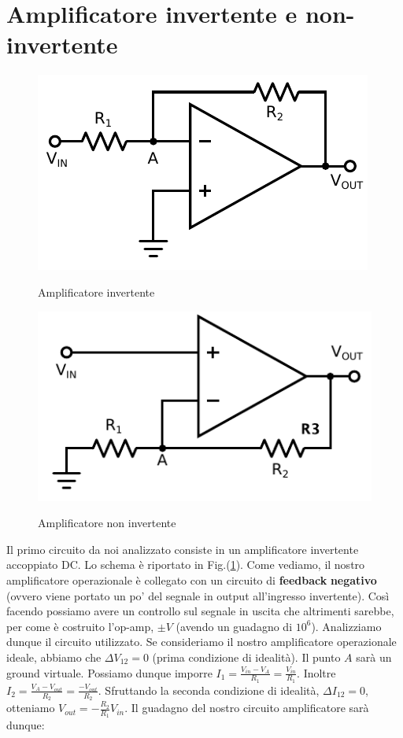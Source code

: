 \section{Amplificatore invertente e non-invertente}

\begin{figure}[h!]
\centering
		\begin{minipage}[c]{.4\textwidth}
			\centering

			\includegraphics[width=.65\textwidth]{ccinv.pdf}
			\label{fig:ccinv}
			\caption{Amplificatore invertente}

		\end{minipage}%
		\hspace{10mm}%
		\begin{minipage}[c]{.4\textwidth}
			\centering

			\includegraphics[width=.65\textwidth]{ccninv.pdf}
			\label{fig:ccninv}
			\caption{Amplificatore non invertente}
			
		\end{minipage}
\end{figure}

Il primo circuito da noi analizzato consiste in un amplificatore invertente accoppiato DC. Lo schema è riportato in Fig.(\ref{}). Come vediamo, il nostro amplificatore operazionale è collegato con un circuito di \textbf{feedback} \textbf{negativo} (ovvero viene portato un po' del segnale in output all'ingresso invertente). Così facendo possiamo avere un controllo sul segnale in uscita che altrimenti sarebbe, per come è costruito l'op-amp, $\pm V$ (avendo un guadagno di $10^6$). Analizziamo dunque il circuito utilizzato. Se consideriamo il nostro amplificatore operazionale ideale, abbiamo che $\Delta V_{12}=0$ (prima condizione di idealità). Il punto $A$ sarà un ground virtuale. Possiamo dunque imporre $I_1=\frac{V_{in}-V_A}{R_1}=\frac{V_{in}}{R_1}$.  Inoltre $I_2=\frac{V_A-V_{out}}{R_2}=\frac{-V_{out}}{R_2}$.
Sfruttando la seconda condizione di idealità, $\Delta I_{12}=0$, otteniamo $V_{out}=-\frac{R_2}{R_1} V_{in}$. Il guadagno del nostro circuito amplificatore sarà dunque:

